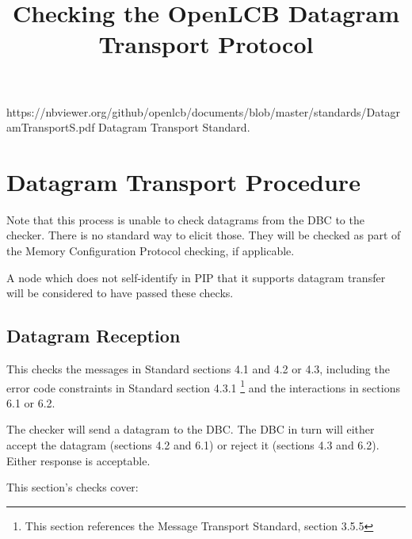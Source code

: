 

\title{Checking the OpenLCB Datagram Transport Protocol}


\maketitle

\introductionCaveats
{https://nbviewer.org/github/openlcb/documents/blob/master/standards/DatagramTransportS.pdf}
{Datagram Transport Standard}.

\section{Datagram Transport Procedure}


Note that this process is unable to check datagrams from the DBC to the checker.
There is no standard way to elicit those.  They will be checked as part of the 
Memory Configuration Protocol checking, if applicable.

A node which does not self-identify in PIP that it supports
datagram transfer will be considered to have passed these checks.
\pipsetFootnote

\subsection{Datagram Reception}

This checks the messages in Standard sections 4.1 and 4.2 or 4.3, 
including the error code constraints in Standard section 4.3.1
\footnote{This section references the Message Transport Standard, 
section 3.5.5}
and the interactions in sections 6.1 or 6.2.

The checker will send a datagram to the DBC. The DBC in turn will 
either accept the datagram (sections 4.2 and 6.1) or 
reject it (sections 4.3 and 6.2). Either response is acceptable.

This section's checks cover:

